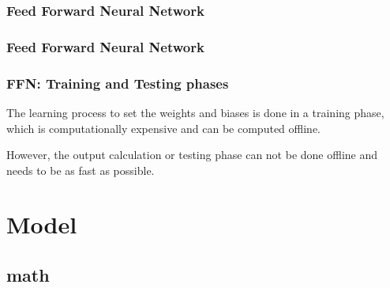 \begin{frame}
  \frametitle{Feed Forward Neural Network}

\end{frame}

\begin{frame}
  \frametitle{Feed Forward Neural Network}

\end{frame}
\begin{frame}
    \frametitle{FFN: Training and Testing phases}

The learning process to set the weights and biases is done in a
{\color{red}training phase}, which is computationally expensive and
can be computed offline.

However, the output calculation or {\color{red}testing phase} can not
be done offline and needs to be as fast as possible.  

\end{frame}

\section{Model}
\subsection{math}

